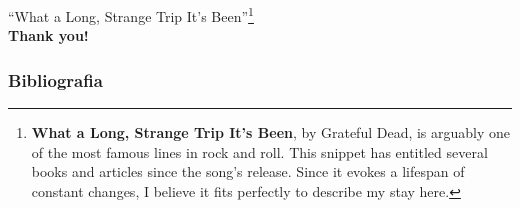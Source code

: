 \documentclass{beamer}
\begin{document}
\begin{frame}[plain,c]\frametitle{}
\begin{center}
\Huge
``What a Long, Strange Trip It's Been''\footnote{
  \textbf{\tiny What a Long, Strange Trip It's Been}, by Grateful Dead, is arguably one of the most famous lines in rock and roll. This snippet has entitled several books and articles since the song's release. Since it evokes a lifespan of constant changes, I believe it fits perfectly to describe my stay here.
  } \\
  \pause
\Huge \textbf{Thank you!}
\smiley
\end{center}
  
\end{frame}

\begin{frame}\frametitle{Bibliografia}
  
  
\end{frame}

\end{document}

